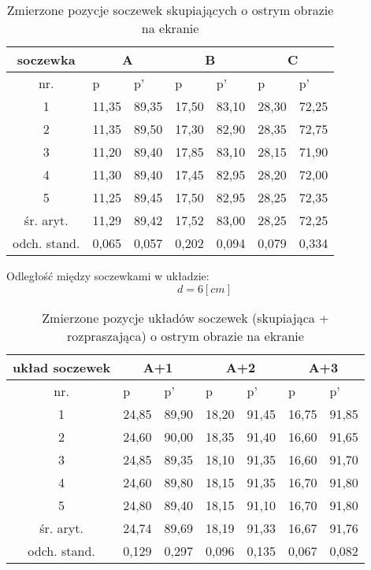 \documentclass{article}
\begin{document}
\begin{table}[!ht]
    \centering
    \begin{tabular}{|c|l|l|l|l|l|l|}
    \hline
         soczewka & \multicolumn{2}{c|}{A} & \multicolumn{2}{c|}{B} & \multicolumn{2}{c|}{C} \\ \hline
         nr. & p & p' & p & p' & p & p' \\ \hline
        1 & 11,35 & 89,35 & 17,50 & 83,10 & 28,30 & 72,25 \\ \hline
        2 & 11,35 & 89,50 & 17,30 & 82,90 & 28,35 & 72,75 \\ \hline
        3 & 11,20 & 89,40 & 17,85 & 83,10 & 28,15 & 71,90 \\ \hline
        4 & 11,30 & 89,40 & 17,45 & 82,95 & 28,20 & 72,00 \\ \hline
        5 & 11,25 & 89,45 & 17,50 & 82,95 & 28,25 & 72,35 \\ \hline
        śr. aryt.  & 11,29 & 89,42 & 17,52 & 83,00 & 28,25 & 72,25 \\ \hline
        odch. stand. & 0,065 & 0,057 & 0,202 & 0,094 & 0,079 & 0,334 \\ \hline
    \end{tabular}
    \caption{Zmierzone pozycje soczewek skupiających o ostrym obrazie na ekranie}
    \label{tab:Pomiar_1}
\end{table}

Odległość między soczewkami w układzie:
\[d = 6[cm]\]

\begin{table}[!ht]
    \centering
    \begin{tabular}{|c|l|l|l|l|l|l|}
    \hline
        układ soczewek& \multicolumn{2}{c|}{A+1} & \multicolumn{2}{c|}{A+2} & \multicolumn{2}{c|}{A+3} \\ \hline
         nr. & p & p' & p & p' & p & p' \\ \hline
        1 & 24,85 & 89,90 & 18,20 & 91,45 & 16,75 & 91,85 \\ \hline
        2 & 24,60 & 90,00 & 18,35 & 91,40 & 16,60 & 91,65 \\ \hline
        3 & 24,85 & 89,35 & 18,10 & 91,35 & 16,60 & 91,70 \\ \hline
        4 & 24,60 & 89,80 & 18,15 & 91,35 & 16,70 & 91,80 \\ \hline
        5 & 24,80 & 89,40 & 18,15 & 91,10 & 16,70 & 91,80 \\ \hline
         śr. aryt.  & 24,74 & 89,69 & 18,19 & 91,33 & 16,67 & 91,76 \\ \hline
         odch. stand. & 0,129 & 0,297 & 0,096 & 0,135 & 0,067 & 0,082 \\ \hline
    \end{tabular}
       \caption{Zmierzone pozycje układów soczewek (skupiająca + rozpraszająca) o ostrym obrazie na ekranie}
    \label{tab:Pomiar_2}
\end{table}
\end{document}

